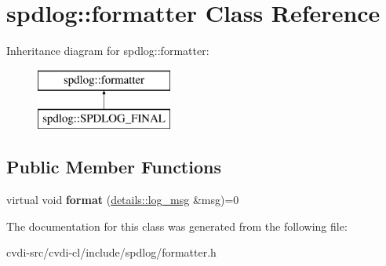 \hypertarget{classspdlog_1_1formatter}{}\section{spdlog\+:\+:formatter Class Reference}
\label{classspdlog_1_1formatter}
Inheritance diagram for spdlog\+:\+:formatter\+:\begin{figure}[H]
\begin{center}
\leavevmode
\includegraphics[height=2.000000cm]{classspdlog_1_1formatter}
\end{center}
\end{figure}
\subsection*{Public Member Functions}
\begin{DoxyCompactItemize}
\item 
virtual void {\bfseries format} (\hyperlink{structspdlog_1_1details_1_1log__msg}{details\+::log\+\_\+msg} \&msg)=0\hypertarget{classspdlog_1_1formatter_a514e1e22aba06bfd8f2bfb9c5789a858}{}\label{classspdlog_1_1formatter_a514e1e22aba06bfd8f2bfb9c5789a858}

\end{DoxyCompactItemize}


The documentation for this class was generated from the following file\+:\begin{DoxyCompactItemize}
\item 
cvdi-\/src/cvdi-\/cl/include/spdlog/formatter.\+h\end{DoxyCompactItemize}
